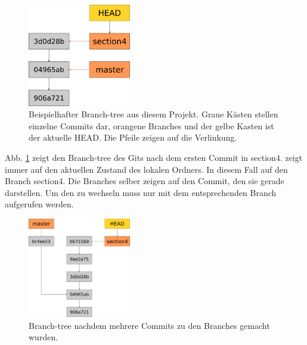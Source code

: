 \begin{figure}[!h]
	\centering
	\includegraphics[width=0.4\textwidth]{Bilder/branching.png}
	\caption{Beispielhafter Branch-tree aus diesem Projekt. Graue Kästen stellen einzelne Commits dar, orangene Branches und der gelbe Kasten ist der aktuelle HEAD. Die Pfeile zeigen auf die Verlinkung.}
	\label{fig:branch_1}
\end{figure}
Abb. \ref{fig:branch_1} zeigt den Branch-tree des Gits nach dem ersten Commit in section4.  zeigt immer auf den aktuellen Zustand des lokalen Ordners. In diesem Fall auf den Branch section4. Die Branches selber zeigen auf den Commit, den sie gerade darstellen. Um den  zu wechseln muss nur  mit dem entsprechenden Branch aufgerufen werden.
\begin{figure}[!h]
	\centering
	\includegraphics[width=0.4\textwidth]{Bilder/branching_2.png}
	\caption{Branch-tree nachdem mehrere Commits zu den Branches gemacht wurden.}
	\label{fig:branch_2}
\end{figure}

